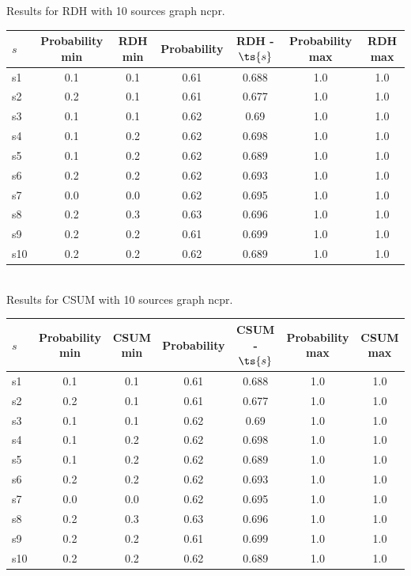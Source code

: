 \documentclass{article}
\begin{document}
\noindent Results for RDH with 10 sources graph ncpr.

\noindent\begin{tabular}{|l|c|c|c|c|c|c|}
\hline
$s$& Probability min & RDH min & Probability & RDH - $\ts{s}$ & Probability max & RDH max\\
\hline
s1 &0.1 & 0.1 & 0.61 & 0.688 & 1.0 & 1.0\\
\hline
s2 &0.2 & 0.1 & 0.61 & 0.677 & 1.0 & 1.0\\
\hline
s3 &0.1 & 0.1 & 0.62 & 0.69 & 1.0 & 1.0\\
\hline
s4 &0.1 & 0.2 & 0.62 & 0.698 & 1.0 & 1.0\\
\hline
s5 &0.1 & 0.2 & 0.62 & 0.689 & 1.0 & 1.0\\
\hline
s6 &0.2 & 0.2 & 0.62 & 0.693 & 1.0 & 1.0\\
\hline
s7 &0.0 & 0.0 & 0.62 & 0.695 & 1.0 & 1.0\\
\hline
s8 &0.2 & 0.3 & 0.63 & 0.696 & 1.0 & 1.0\\
\hline
s9 &0.2 & 0.2 & 0.61 & 0.699 & 1.0 & 1.0\\
\hline
s10 &0.2 & 0.2 & 0.62 & 0.689 & 1.0 & 1.0\\
\hline
\end{tabular}\\

\noindent Results for CSUM with 10 sources graph ncpr.

\noindent\begin{tabular}{|l|c|c|c|c|c|c|}
\hline
$s$& Probability min & CSUM min & Probability & CSUM - $\ts{s}$ & Probability max & CSUM max\\
\hline
s1 &0.1 & 0.1 & 0.61 & 0.688 & 1.0 & 1.0\\
\hline
s2 &0.2 & 0.1 & 0.61 & 0.677 & 1.0 & 1.0\\
\hline
s3 &0.1 & 0.1 & 0.62 & 0.69 & 1.0 & 1.0\\
\hline
s4 &0.1 & 0.2 & 0.62 & 0.698 & 1.0 & 1.0\\
\hline
s5 &0.1 & 0.2 & 0.62 & 0.689 & 1.0 & 1.0\\
\hline
s6 &0.2 & 0.2 & 0.62 & 0.693 & 1.0 & 1.0\\
\hline
s7 &0.0 & 0.0 & 0.62 & 0.695 & 1.0 & 1.0\\
\hline
s8 &0.2 & 0.3 & 0.63 & 0.696 & 1.0 & 1.0\\
\hline
s9 &0.2 & 0.2 & 0.61 & 0.699 & 1.0 & 1.0\\
\hline
s10 &0.2 & 0.2 & 0.62 & 0.689 & 1.0 & 1.0\\
\hline
\end{tabular}\\
\end{document}
